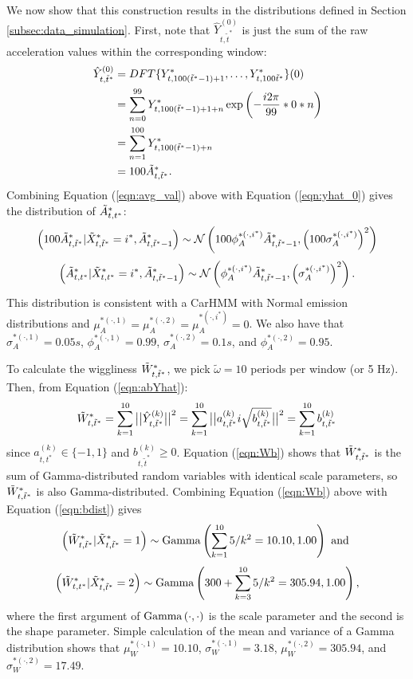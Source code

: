 We now show that this construction results in the distributions defined in Section \ref{subsec:data_simulation}. First, note that $\hat{Y}^{(0)}_{t,\tilde t^*}$ is just the sum of the raw acceleration values within the corresponding window:
%
\begin{align}
    \hat{Y}^{(0)}_{t,\tilde t^*} &= DFT\{Y^*_{t,100(\tilde t^*-1) + 1},\ldots,Y^*_{t,100\tilde t^*}\}(0) \nonumber \\
    &= \sum_{n=0}^{99} Y^*_{t,100(\tilde t^*-1) + 1 + n} \exp\left(-\frac{i2\pi}{99}*0*n\right) \nonumber \\
    &= \sum_{n=1}^{100} Y^*_{t,100(\tilde t^*-1) + n} \nonumber \\
    &= 100\Zone_{t,\tilde t^*}.
    \label{eqn:avg_val}
\end{align}
%
Combining Equation (\ref{eqn:avg_val}) above with Equation (\ref{eqn:yhat_0}) gives the distribution of $\tilde{A}^*_{t,t^*}$: 
%
$$\left(100\tilde{A}^*_{t,\tilde t^*} | \tilde X^*_{t,\tilde t^*} = i^*, \tilde{A}^*_{t,\tilde t^*-1} \right) \sim \mathcal{N} \left(100\phi_A^{*(\cdot,i^*)} \tilde{A}^*_{t,\tilde t^*-1}, \left(100\sigma_A^{*(\cdot,i^*)}\right)^2 \right)$$
%
$$\left(\tilde{A}^*_{t,t^*} | \tilde X^*_{t,t^*} = i^*, \tilde{A}^*_{t,\tilde t^*-1} \right) \sim \mathcal{N} \left(\phi_A^{*(\cdot,i^*)} \tilde{A}^*_{t,\tilde t^*-1}, \left(\sigma_A^{*(\cdot,i^*)}\right)^2 \right).$$
%
This distribution is consistent with a CarHMM with Normal emission distributions and $\mu_A^{*(\cdot,1)} = \mu_A^{*(\cdot,2)} = \mu_A^{*(\cdot,i^*)} = 0$. We also have that $\sigma_A^{*(\cdot,1)} = 0.05s$, $\phi_A^{*(\cdot,1)} = 0.99$, $\sigma_A^{*(\cdot,2)} = 0.1s$, and $\phi_A^{*(\cdot,2)} = 0.95$.

To calculate the wiggliness $\tilde{W}^*_{t,\tilde t^*}$, we pick $\tilde{\omega} = 10$ periods per window (or 5 Hz). Then, from Equation (\ref{eqn:abYhat}):
%
\begin{equation}
    \Ztwo_{t,\tilde t^*} = \sum_{k=1}^{10} \big|\big|\hat{Y}^{(k)}_{t,\tilde t^*}\big|\big|^2 = \sum_{k=1}^{10} \big|\big|a^{(k)}_{t,\tilde t^*}i\sqrt{b^{(k)}_{t,\tilde t^*}}\big|\big|^2 = \sum_{k=1}^{10} b^{(k)}_{t,\tilde t^*}
    \label{eqn:Wb}
\end{equation}
%
since $a^{(k)}_{t,t^*} \in \{-1,1\}$ and $b^{(k)}_{t,\tilde t^*} \geq 0$. Equation (\ref{eqn:Wb}) shows that $\tilde{W}^*_{t,\tilde t^*}$ is the sum of Gamma-distributed random variables with identical scale parameters, so $\tilde{W}^*_{t,\tilde t^*}$ is also Gamma-distributed. Combining Equation (\ref{eqn:Wb}) above with Equation (\ref{eqn:bdist}) gives
%
$$\left(\tilde{W}^*_{t,\tilde t^*}|\tilde X^*_{t,\tilde t^*} = 1\right) \sim {\rm{Gamma}}\left(\sum_{k=1}^{10} 5/k^2 = 10.10, 1.00 \right) \text { and }$$
%
$$\left(\tilde{W}^*_{t,t^*}|\tilde X^*_{t,\tilde t^*} = 2\right) \sim {\rm{Gamma}}\left(300 + \sum_{k=3}^{10} 5/k^2 = 305.94 , 1.00 \right),$$
%
where the first argument of ${\rm{Gamma}}\left(\cdot,\cdot\right)$ is the scale parameter and the second is the shape parameter. Simple calculation of the mean and variance of a Gamma distribution shows that $\mu_W^{*(\cdot,1)} = 10.10$, $\sigma_W^{*(\cdot,1)} = 3.18$, $\mu_W^{*(\cdot,2)} = 305.94$, and $\sigma_W^{*(\cdot,2)} = 17.49$.

